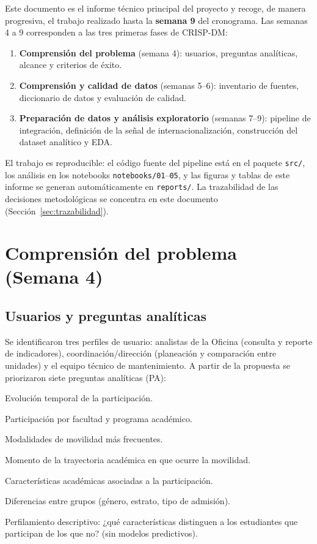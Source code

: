 \documentclass[12pt,a4paper]{article}
\begin{document}
Este documento es el informe técnico principal del proyecto y recoge, de manera
progresiva, el trabajo realizado hasta la \textbf{semana 9} del cronograma. Las
semanas 4 a 9 corresponden a las tres primeras fases de CRISP-DM:

\begin{enumerate}[leftmargin=*]
    \item \textbf{Comprensión del problema} (semana 4): usuarios, preguntas
    analíticas, alcance y criterios de éxito.
    \item \textbf{Comprensión y calidad de datos} (semanas 5--6): inventario de
    fuentes, diccionario de datos y evaluación de calidad.
    \item \textbf{Preparación de datos y análisis exploratorio} (semanas 7--9):
    pipeline de integración, definición de la señal de internacionalización,
    construcción del dataset analítico y EDA.
\end{enumerate}

El trabajo es reproducible: el código fuente del pipeline está en el paquete
\texttt{src/}, los análisis en los notebooks \texttt{notebooks/01}--\texttt{05},
y las figuras y tablas de este informe se generan automáticamente en
\texttt{reports/}. La trazabilidad de las decisiones metodológicas se concentra
en este documento (Sección~\ref{sec:trazabilidad}).

\section{Comprensión del problema (Semana 4)}
\subsection{Usuarios y preguntas analíticas}
Se identificaron tres perfiles de usuario: analistas de la Oficina (consulta y
reporte de indicadores), coordinación/dirección (planeación y comparación entre
unidades) y el equipo técnico de mantenimiento. A partir de la propuesta se
priorizaron siete preguntas analíticas (PA):

\begin{description}[leftmargin=1.4cm,style=nextline]
    \item[PA1] Evolución temporal de la participación.
    \item[PA2] Participación por facultad y programa académico.
    \item[PA3] Modalidades de movilidad más frecuentes.
    \item[PA4] Momento de la trayectoria académica en que ocurre la movilidad.
    \item[PA5] Características académicas asociadas a la participación.
    \item[PA6] Diferencias entre grupos (género, estrato, tipo de admisión).
    \item[PA7] Perfilamiento descriptivo: ¿qué características distinguen a los
    estudiantes que participan de los que no? (sin modelos predictivos).
\end{description}
\end{document}
